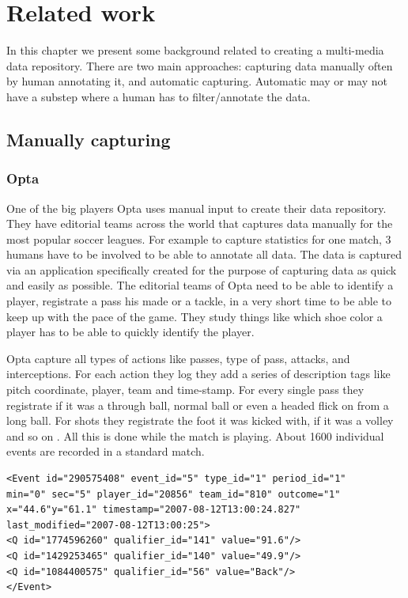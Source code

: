 

\section{Related work} \label{Related work:capturing data}
In this chapter we present some background related to creating a multi-media data repository. There are two main approaches: capturing data manually often by human annotating it, and automatic capturing. Automatic may or may not have a substep where a human has to filter/annotate the data. 

\subsection{Manually capturing }

\subsubsection{Opta }


One of the big players Opta uses manual input to create their data repository. They have editorial teams across the world that captures data manually for the most popular soccer leagues. For example to capture statistics for one match, 3 humans have to be involved to be able to annotate all data. The data is captured via an application specifically created for the purpose of capturing data as quick and easily as possible. The editorial teams of Opta need to be able to identify a player, registrate a pass his made or a tackle, in a very short time to be able to keep up with the pace of the game. They study things like which shoe color a player has to be able to quickly identify the player.

Opta capture all types of actions like passes, type of pass, attacks, and interceptions. For each action they log they add a series of description tags like pitch coordinate, player, team and time-stamp. For every single pass they registrate if it was a through ball, normal ball or even a headed flick on from a long ball. For shots they registrate the foot it was kicked with, if it was a volley and so on . All this is done while the match is playing. About 1600 individual events are recorded in a standard match. 

\begin{lstlisting}
<Event id="290575408" event_id="5" type_id="1" period_id="1" 
min="0" sec="5" player_id="20856" team_id="810" outcome="1" 
x="44.6"y="61.1" timestamp="2007-08-12T13:00:24.827" 
last_modified="2007-08-12T13:00:25">
<Q id="1774596260" qualifier_id="141" value="91.6"/>
<Q id="1429253465" qualifier_id="140" value="49.9"/>
<Q id="1084400575" qualifier_id="56" value="Back"/>
</Event>
\end{lstlisting}

